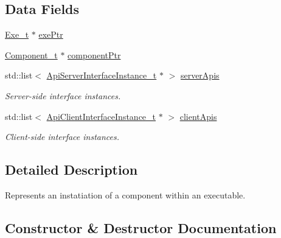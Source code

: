 \subsection*{Data Fields}
\begin{DoxyCompactItemize}
\item 
\hyperlink{structmodel_1_1_exe__t}{Exe\+\_\+t} $\ast$ \hyperlink{structmodel_1_1_component_instance__t_a58482ce4be750f72cd09016a29b9d988}{exe\+Ptr}
\item 
\hyperlink{structmodel_1_1_component__t}{Component\+\_\+t} $\ast$ \hyperlink{structmodel_1_1_component_instance__t_a476bfa6b0e1f532eeb521c573cfa2f70}{component\+Ptr}
\item 
std\+::list$<$ \hyperlink{structmodel_1_1_api_server_interface_instance__t}{Api\+Server\+Interface\+Instance\+\_\+t} $\ast$ $>$ \hyperlink{structmodel_1_1_component_instance__t_a647c3093ee11fa933ac2ef2c7a11bfce}{server\+Apis}
\begin{DoxyCompactList}\small\item\em Server-\/side interface instances. \end{DoxyCompactList}\item 
std\+::list$<$ \hyperlink{structmodel_1_1_api_client_interface_instance__t}{Api\+Client\+Interface\+Instance\+\_\+t} $\ast$ $>$ \hyperlink{structmodel_1_1_component_instance__t_a09d4f636759f8877bdc8ba60e8b8b3dd}{client\+Apis}
\begin{DoxyCompactList}\small\item\em Client-\/side interface instances. \end{DoxyCompactList}\end{DoxyCompactItemize}


\subsection{Detailed Description}
Represents an instatiation of a component within an executable. 

\subsection{Constructor \& Destructor Documentation}
